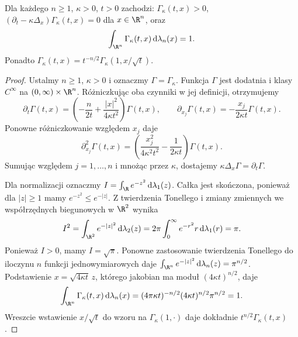\begin{twierdzenie}
\label{thm:pde4-gauss-basic}
Dla każdego $n\geq1$, $\kappa>0$, $t>0$ zachodzi:
$\Gamma_\kappa(t,x)>0$,
$(\partial_t-\kappa\Delta_x)\Gamma_\kappa(t,x)=0$
dla $x\in\R^n$, oraz
\begin{equation}\label{eq:pde4-normalize}
 \int_{\R^n}\Gamma_\kappa(t,x)\,\mathrm d\lambda_n(x)=1.
\end{equation}
Ponadto $\Gamma_\kappa(t,x)=t^{-n/2}\Gamma_\kappa(1,x/\sqrt t)$.
\end{twierdzenie}
\begin{proof}
Ustalmy $n\geq1$, $\kappa>0$ i oznaczmy
$\Gamma=\Gamma_\kappa$. Funkcja $\Gamma$ jest
dodatnia i klasy $C^\infty$ na $(0,\infty)\times\R^n$.
Różniczkując oba czynniki w jej definicji, otrzymujemy
\[
 \partial_t\Gamma(t,x)=
 \left(-\frac n{2t}+\frac{|x|^2}{4\kappa t^2}\right)
 \Gamma(t,x),\qquad
 \partial_{x_j}\Gamma(t,x)=-\frac{x_j}{2\kappa t}\Gamma(t,x).
\]
Ponowne różniczkowanie względem $x_j$ daje
\[
 \partial_{x_j}^2\Gamma(t,x)
 =\left(\frac{x_j^2}{4\kappa^2t^2}
 -\frac1{2\kappa t}\right)\Gamma(t,x).
\]
Sumując względem $j=1,\ldots,n$ i mnożąc przez
$\kappa$, dostajemy $\kappa\Delta_x\Gamma=\partial_t\Gamma$.

Dla normalizacji oznaczmy
$I=\int_\R e^{-z^2}\,\mathrm d\lambda_1(z)$.
Całka jest skończona, ponieważ dla $|z|\geq1$
mamy $e^{-z^2}\leq e^{-|z|}$.
Z twierdzenia Tonellego i zmiany zmiennych
we współrzędnych biegunowych w $\R^2$ wynika
\[
 I^2=\int_{\R^2}e^{-|z|^2}\,\mathrm d\lambda_2(z)
 =2\pi\int_0^\infty e^{-r^2}r\,\mathrm d\lambda_1(r)
 =\pi.
\]
Ponieważ $I>0$, mamy $I=\sqrt\pi$.
Ponowne zastosowanie twierdzenia Tonellego
do iloczynu $n$ funkcji jednowymiarowych daje
$\int_{\R^n}e^{-|z|^2}\,\mathrm d\lambda_n(z)=\pi^{n/2}$.
Podstawienie $x=\sqrt{4\kappa t}\,z$, którego
jakobian ma moduł $(4\kappa t)^{n/2}$, daje
\[
 \int_{\R^n}\Gamma_\kappa(t,x)\,\mathrm d\lambda_n(x)
 =(4\pi\kappa t)^{-n/2}(4\kappa t)^{n/2}\pi^{n/2}
 =1.
\]
Wreszcie wstawienie $x/\sqrt t$ do wzoru na
$\Gamma_\kappa(1,\cdot)$ daje dokładnie
$t^{n/2}\Gamma_\kappa(t,x)$.
\end{proof}

